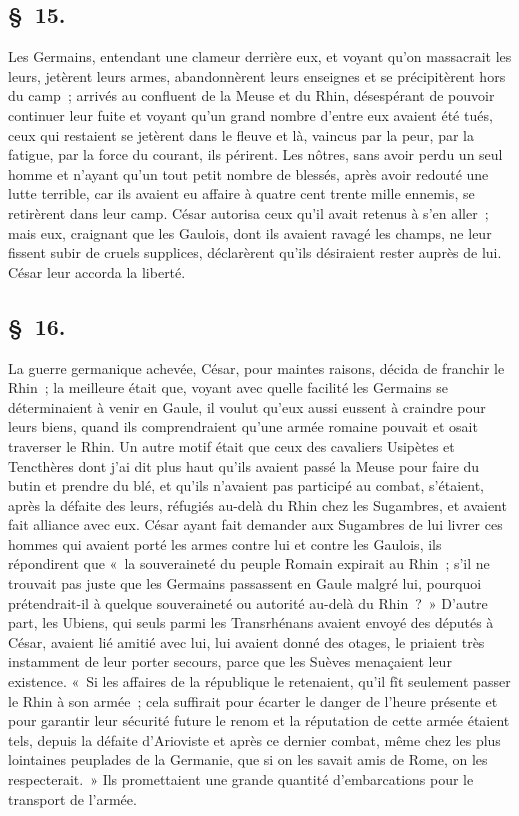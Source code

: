 \documentclass[french,twoside]{book} %
\begin{document}
\subsection[{§ 15.}]{ \textsc{§ 15.} }
\noindent Les Germains, entendant une clameur derrière eux, et voyant qu’on massacrait les leurs, jetèrent leurs armes, abandonnèrent leurs enseignes et se précipitèrent hors du camp ; arrivés au confluent de la Meuse et du Rhin, désespérant de pouvoir continuer leur fuite et voyant qu’un grand nombre d’entre eux avaient été tués, ceux qui restaient se jetèrent dans le fleuve et là, vaincus par la peur, par la fatigue, par la force du courant, ils périrent. Les nôtres, sans avoir perdu un seul homme et n’ayant qu’un tout petit nombre de blessés, après avoir redouté une lutte terrible, car ils avaient eu affaire à quatre cent trente mille ennemis, se retirèrent dans leur camp. César autorisa ceux qu’il avait retenus à s’en aller ; mais eux, craignant que les Gaulois, dont ils avaient ravagé les champs, ne leur fissent subir de cruels supplices, déclarèrent qu’ils désiraient rester auprès de lui. César leur accorda la liberté.
\subsection[{§ 16.}]{ \textsc{§ 16.} }
\noindent La guerre germanique achevée, César, pour maintes raisons, décida de franchir le Rhin ; la meilleure était que, voyant avec quelle facilité les Germains se déterminaient à venir en Gaule, il voulut qu’eux aussi eussent à craindre pour leurs biens, quand ils comprendraient qu’une armée romaine pouvait et osait traverser le Rhin. Un autre motif était que ceux des cavaliers Usipètes et Tencthères dont j’ai dit plus haut qu’ils avaient passé la Meuse pour faire du butin et prendre du blé, et qu’ils n’avaient pas participé au combat, s’étaient, après la défaite des leurs, réfugiés au-delà du Rhin chez les Sugambres, et avaient fait alliance avec eux. César ayant fait demander aux Sugambres de lui livrer ces hommes qui avaient porté les armes contre lui et contre les Gaulois, ils répondirent que « la souveraineté du peuple Romain expirait au Rhin ; s’il ne trouvait pas juste que les Germains passassent en Gaule malgré lui, pourquoi prétendrait-il à quelque souveraineté ou autorité au-delà du Rhin ? » D'autre part, les Ubiens, qui seuls parmi les Transrhénans avaient envoyé des députés à César, avaient lié amitié avec lui, lui avaient donné des otages, le priaient très instamment de leur porter secours, parce que les Suèves menaçaient leur existence. « Si les affaires de la république le retenaient, qu’il fît seulement passer le Rhin à son armée ; cela suffirait pour écarter le danger de l’heure présente et pour garantir leur sécurité future le renom et la réputation de cette armée étaient tels, depuis la défaite d’Arioviste et après ce dernier combat, même chez les plus lointaines peuplades de la Germanie, que si on les savait amis de Rome, on les respecterait. » Ils promettaient une grande quantité d’embarcations pour le transport de l’armée.
\end{document}
